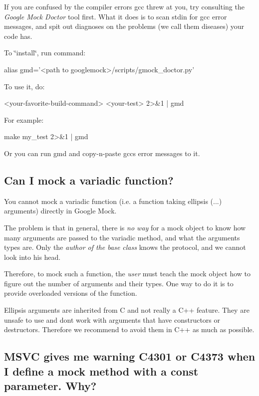 If you are confused by the compiler errors gcc threw at you, try consulting the {\itshape Google Mock Doctor} tool first. What it does is to scan stdin for gcc error messages, and spit out diagnoses on the problems (we call them diseases) your code has.

To \char`\"{}install\char`\"{}, run command\+: 
\begin{DoxyCode}
alias gmd='<path to googlemock>/scripts/gmock\_doctor.py'
\end{DoxyCode}


To use it, do\+: 
\begin{DoxyCode}
<your-favorite-build-command> <your-test> 2>&1 | gmd
\end{DoxyCode}


For example\+: 
\begin{DoxyCode}
make my\_test 2>&1 | gmd
\end{DoxyCode}


Or you can run {\ttfamily gmd} and copy-\/n-\/paste gcc\textquotesingle{}s error messages to it.

\subsection*{Can I mock a variadic function?}

You cannot mock a variadic function (i.\+e. a function taking ellipsis ({\ttfamily ...}) arguments) directly in Google Mock.

The problem is that in general, there is {\itshape no way} for a mock object to know how many arguments are passed to the variadic method, and what the arguments\textquotesingle{} types are. Only the {\itshape author of the base class} knows the protocol, and we cannot look into his head.

Therefore, to mock such a function, the {\itshape user} must teach the mock object how to figure out the number of arguments and their types. One way to do it is to provide overloaded versions of the function.

Ellipsis arguments are inherited from C and not really a C++ feature. They are unsafe to use and don\textquotesingle{}t work with arguments that have constructors or destructors. Therefore we recommend to avoid them in C++ as much as possible.

\subsection*{M\+S\+VC gives me warning C4301 or C4373 when I define a mock method with a const parameter. Why?}

